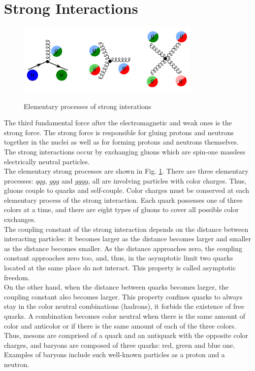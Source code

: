 \section{Strong Interactions}
\label{sec:Intro_QCD}

\begin{figure}[htb]
  \begin{center}
    {\includegraphics[width=0.80\textwidth]{../figs/Intro/feynmStrong.png}}
    \caption{Elementary processes of strong interations}
    \label{fig:feynmStrong}
  \end{center}
\end{figure}


The third fundamental force after the electromagnetic and weak ones is the strong force. The strong force is responsible for gluing protons and neutrons together in the nuclei as well as for forming protons and neutrons themselves. The strong interactions occur by exchanging gluons which are spin-one massless electrically neutral particles.  \\

The elementary strong processes are shown in Fig. \ref{fig:feynmStrong}. There are three elementary processes: $qqg$, $ggg$ and $gggg$, all are involving particles with color charges. Thus, gluons couple to quarks and self-couple. Color charges must be conserved at each elementary process of the strong interaction. Each quark possesses one of three colors at a time, and there are eight types of gluons to cover all possible color exchanges. \\

The coupling constant of the strong interaction depends on the distance between interacting particles: it becomes larger as the distance becomes larger and smaller as the distance becomes smaller. As the distance approaches zero, the coupling constant approaches zero too, and, thus, in the asymptotic limit two quarks located at the same place do not interact. This property is called asymptotic freedom.\\

On the other hand, when the distance between quarks becomes larger, the coupling constant also becomes larger. This property confines quarks to always stay in the color neutral combinations (hadrons), it forbids the existence of free quarks. A combination becomes color neutral when there is the same amount of color and anticolor or if there is the same amount of each of the three colors.  Thus, mesons are comprised of a quark and an antiquark with the opposite color charges, and baryons are composed of three quarks: red, green and blue one. Examples of baryons include such well-known particles as a proton and a neutron.\\

